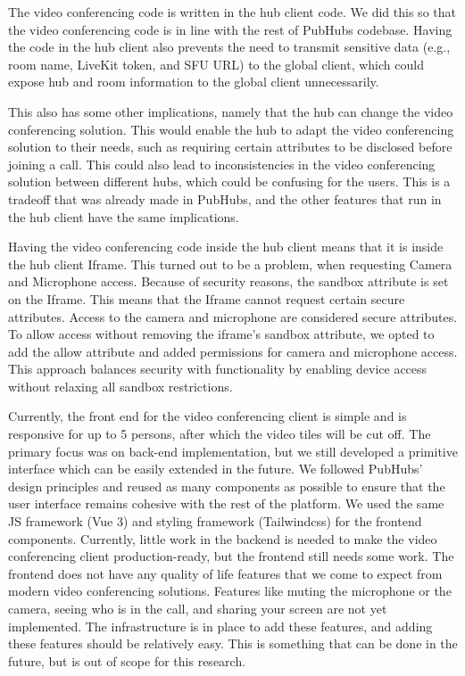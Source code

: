 \documentclass{report}
\begin{document}
The video conferencing code is written in the hub client code. We did this so that the video conferencing code is in
line with the rest of PubHubs codebase.
Having the code in the hub client also prevents the need to transmit sensitive data (e.g., room name, LiveKit token,
and SFU URL) to the global client, which could expose hub and room information to the global client unnecessarily.

This also has some other implications, namely that the hub can change the video conferencing solution.
This would enable the hub to adapt the video conferencing solution to their needs, such as requiring certain
attributes to be disclosed before joining a call.
This could also lead to inconsistencies in the video conferencing solution between different hubs, which could be
confusing for the users. This is a tradeoff that was already made in PubHubs, and the other features that run in the
hub client have the same implications.

Having the video conferencing code inside the hub client means that it is inside the hub client Iframe.
This turned out to be a problem, when requesting Camera and Microphone access. Because of security reasons, the
sandbox attribute is set on the Iframe. This means that the Iframe cannot request certain secure attributes.
Access to the camera and microphone are considered secure attributes.
To allow access without removing the iframe’s sandbox attribute, we opted to add the allow attribute and added
permissions for camera and microphone access.
This approach balances security with functionality by enabling device access without relaxing all sandbox restrictions.

Currently, the front end for the video conferencing client is simple and is responsive for up to 5 persons, after which
the video tiles will be cut off.
The primary focus was on back-end implementation, but we still developed a primitive interface which can be easily
extended in the future.
We followed PubHubs’ design principles and reused as many components as possible to ensure that the user interface
remains cohesive with the rest of the platform. We used the same JS framework (Vue 3) and styling framework (Tailwindcss)
for the frontend components. Currently, little work in the backend is needed to make the video conferencing client production-ready, but the frontend still needs some work. The frontend does not have any quality
of life features that we come to expect from modern video conferencing solutions. Features like muting the
microphone or the camera, seeing who is in the call, and sharing your screen are not yet implemented. The
infrastructure is in place to add these features, and adding these features should be relatively easy. This is
something that can be done in the future, but is out of scope for this research.
\end{document}
